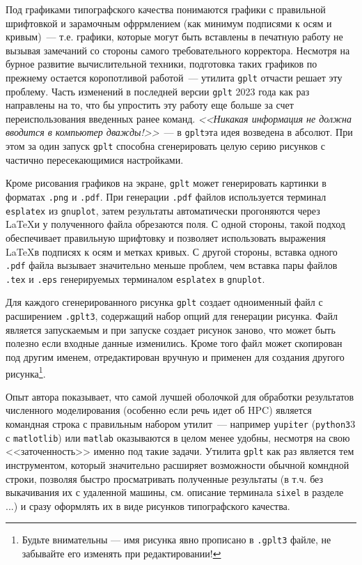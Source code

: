 \documentclass[12pt]{article}
\def\gplt{{\tt gplt}}
\def\gnuplot{{\tt gnuplot}}
\def\python{{\tt python3}}
\def\png{{\tt .png}}
\def\pdf{{\tt .pdf}}
\begin{document}
Под графиками типографского качества понимаются графики с правильной шрифтовкой и зарамочным офррмлением (как минимум подписями к осям и кривым)~---
т.е. графики, которые могут быть  вставлены в печатную
работу не вызывая замечаний со стороны самого требовательного корректора. Несмотря на бурное развитие вычислительной техники, подготовка таких графиков по прежнему
остается коропотливой работой~--- утилита \gplt{} отчасти решает эту проблему.
Часть изменений в последней версии \gplt{} 2023 года как раз направлены на то, что бы упростить эту работу
еще больше за счет переиспользования введенных ранее команд. {\it<<Никакая информация не должна вводится в компьютер дважды!>>}~--- в \gplt эта идея возведена в абсолют.
При этом за один запуск \gplt{} способна сгенерировать целую серию рисунков с частично пересекающимися настройками.

Кроме рисования графиков на экране, \gplt{} может генерировать картинки в форматах \png{} и \pdf.  При генерации \pdf{}  файлов используется терминал {\tt esplatex}
из \gnuplot, затем результаты автоматически прогоняются через \LaTeX и у полученного файла обрезаются поля. С одной стороны, такой подход  обеспечивает правильную
шрифтовку и позволяет использовать выражения \LaTeX в подписях к осям и метках кривых. С другой стороны, вставка одного \pdf{} файла вызывает
значительно меньше проблем, чем вставка пары файлов \verb'.tex' и \verb'.eps' генерируемых терминалом {\tt esplatex} в \gnuplot.

Для каждого сгенерированного рисунка \gplt{} создает одноименный  файл с расширением \verb'.gplt3', содержащий набор опций для генерации рисунка.
Файл является запускаемым и при запуске создает рисунок заново, что может быть полезно если входные данные изменились.
Кроме того файл может скопирован под другим именем, отредактирован вручную и применен для создания другого рисунка\footnote{Будьте внимательны ---
  имя рисунка явно прописано в {\tt .gplt3} файле, не забывайте его изменять при редактировании!}.

Опыт автора показывает, что самой лучшей оболочкой для обработки результатов численного моделирования (особенно если речь идет об HPC) является командная строка
с правильным набором утилит~--- например \verb'yupiter' (\python3 с \verb'matlotlib') или \verb'matlab' оказываются в целом менее удобны, несмотря на свою <<заточенность>>
именно под такие задачи. Утилита   \gplt{} как раз является тем инструментом, который значительно расширяет возможности обычной комндной строки,
позволяя быстро просматривать полученные результаты (в т.ч.
без выкачивания их с удаленной машины, см. описание терминала \verb'sixel' в разделе ...) и сразу оформлять их в виде рисунков типографского качества. 
\end{document}
